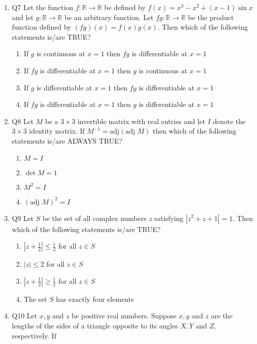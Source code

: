 \documentclass{article}
\begin{document}
\begin{enumerate}
\item Q7 Let the function $f: \mathbb{R} \to \mathbb{R}$ be defined by $f(x) = x^3 - x^2 + (x - 1) \sin x$ and let $g: \mathbb{R} \to \mathbb{R}$ be an arbitrary function. Let $fg: \mathbb{R} \to \mathbb{R}$ be the product function defined by $(fg)(x) = f(x)g(x)$. Then which of the following statements is/are TRUE?

    \begin{enumerate}
        \item  If $g$ is continuous at $x = 1$ then $fg$ is differentiable at $x = 1$
        \item  If $fg$ is differentiable at $x = 1$ then $g$ is continuous at $x = 1$
        \item  If $g$ is differentiable at $x = 1$ then $fg$ is differentiable at $x = 1$
        \item  If $fg$ is differentiable at $x = 1$ then $g$ is differentiable at $x = 1$
    \end{enumerate}

\item Q8 Let $M$ be a $3 \times 3$ invertible matrix with real entries and let $I$ denote the $3 \times 3$ identity matrix. If $ M^{-1} = \text{adj}(\text{adj } M)$ then which of the following statements is/are ALWAYS TRUE?

    \begin{enumerate}
        \item  $M = I$
        \item  $\det M = 1$
        \item  $M^2 = I$
        \item  $(\text{adj } M)^2 = I$
    \end{enumerate}
\item Q9 Let $S$ be the set of all complex numbers $z$ satisfying $|z^2 + z + 1| = 1$. Then which of the following statements is/are TRUE?

    \begin{enumerate}
        \item  $|z + \frac{1}{2}| \leq \frac{1}{2}$ for all $z \in S$
        \item  $|z| \leq 2$ for all $z \in S$
        \item  $|z + \frac{1}{2}| \geq \frac{1}{2}$ for all $z \in S$
        \item  The set $S$ has exactly four elements
    \end{enumerate}

\item Q10 Let $x, y$ and $z$ be positive real numbers. Suppose $x, y$ and $z$ are the lengths of the sides of a triangle opposite to its angles $X, Y$ and $Z$, respectively. If 


\end{enumerate}
\end{document}
